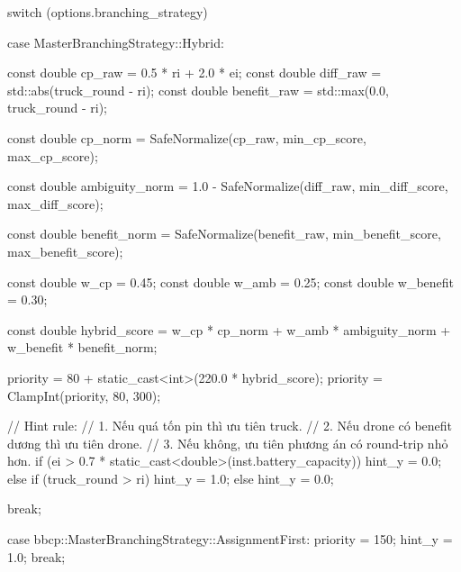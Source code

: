 {{{{{                    switch (options.branching_strategy)
                    {

                    case MasterBranchingStrategy::Hybrid:
                    {
                        const double cp_raw = 0.5 * ri + 2.0 * ei;
                        const double diff_raw = std::abs(truck_round - ri);
                        const double benefit_raw = std::max(0.0, truck_round - ri);

                        const double cp_norm =
                            SafeNormalize(cp_raw, min_cp_score, max_cp_score);

                        const double ambiguity_norm =
                            1.0 - SafeNormalize(diff_raw, min_diff_score, max_diff_score);

                        const double benefit_norm =
                            SafeNormalize(benefit_raw, min_benefit_score, max_benefit_score);

                        const double w_cp = 0.45;
                        const double w_amb = 0.25;
                        const double w_benefit = 0.30;

                        const double hybrid_score =
                            w_cp * cp_norm +
                            w_amb * ambiguity_norm +
                            w_benefit * benefit_norm;

                        priority = 80 + static_cast<int>(220.0 * hybrid_score);
                        priority = ClampInt(priority, 80, 300);

                        // Hint rule:
                        // 1. Nếu quá tốn pin thì ưu tiên truck.
                        // 2. Nếu drone có benefit dương thì ưu tiên drone.
                        // 3. Nếu không, ưu tiên phương án có round-trip nhỏ hơn.
                        if (ei > 0.7 * static_cast<double>(inst.battery_capacity))
                        {
                            hint_y = 0.0;
                        }
                        else if (truck_round > ri)
                        {
                            hint_y = 1.0;
                        }
                        else
                        {
                            hint_y = 0.0;
                        }

                        break;
                    }

                    case bbcp::MasterBranchingStrategy::AssignmentFirst:
                    {
                        priority = 150;
                        hint_y = 1.0;
                        break;
                    }

}}}}}}
